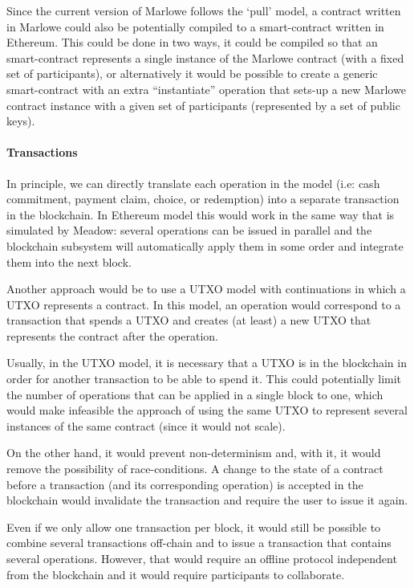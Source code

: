 \documentclass[
      acmsmall
    , screen
  ]{acmart}
\begin{document}
Since the current version of Marlowe follows the `pull' model, a contract written in Marlowe could also be potentially
compiled to a smart-contract written in Ethereum. This could be done in two ways, it could be compiled so that an 
smart-contract represents a single instance of the Marlowe contract (with a fixed set of participants), or 
alternatively it would be possible to create a generic smart-contract with an extra ``instantiate'' operation that 
sets-up a new Marlowe contract instance with a given set of participants (represented by a set of public keys).

\paragraph{Transactions}

In principle, we can directly translate each operation in the model (i.e: cash commitment, payment claim, choice, or
redemption) into a separate transaction in the blockchain. In Ethereum model this would work in the same 
way that is simulated by Meadow: several operations can be issued in parallel and the blockchain subsystem will 
automatically apply them in some order and integrate them into the next block.

Another approach would be to use a UTXO model with continuations in which a UTXO represents a contract. In this model,
an operation would correspond to a transaction that spends a UTXO and creates (at least) a new UTXO that represents the 
contract after the operation.

Usually, in the UTXO model, it is necessary that a UTXO is in the blockchain in order for another transaction to be able 
to spend it. This could potentially limit the number of operations that can be applied in a single block to one, which 
would make infeasible the approach of using the same UTXO to represent several instances of the same contract (since it 
would not scale).

On the other hand, it would prevent non-determinism and, with it, it would remove the possibility of race-conditions. A 
change to the state of a contract before a transaction (and its corresponding operation) is accepted in the blockchain 
would invalidate the transaction and require the user to issue it again.

Even if we only allow one transaction per block, it would still be possible to combine several transactions off-chain 
and to issue a transaction that contains several operations. However, that would require an offline protocol 
independent from the blockchain and it would require participants to collaborate.
\end{document}
